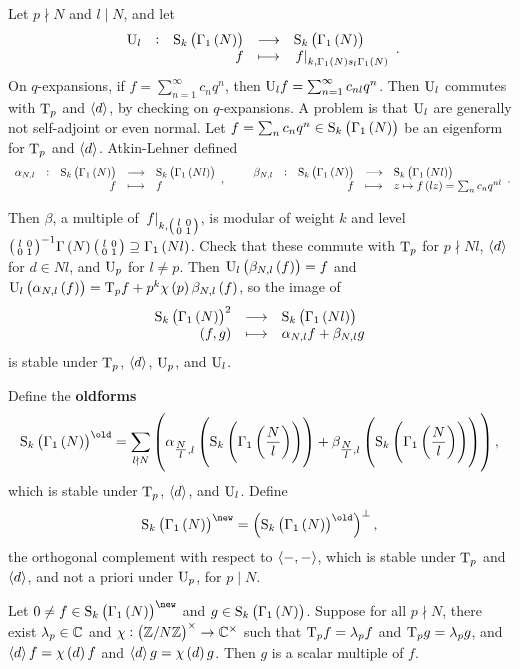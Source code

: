 
Let $ p \nmid N $ and $ l \mid N $, and let
$$ \function[\U_l]{\S_k\br{\Gamma_1\br{N}}}{\S_k\br{\Gamma_1\br{N}}}{f}{\eval{f}_{k, \Gamma_1\br{N}s_l\Gamma_1\br{N}}}. $$
On $ q $-expansions, if $ f = \sum_{n = 1}^\infty c_nq^n $, then $ \mathrm{U}_lf = \sum_{n = 1}^\infty c_{nl}q^n $. Then $ \mathrm{U}_l $ commutes with $ \mathrm{T}_p $ and $ \left\langle d \right\rangle $, by checking on $ q $-expansions. A problem is that $ \mathrm{U}_l $ are generally not self-adjoint or even normal. Let $ f = \sum_n c_nq^n \in \S_k\br{\Gamma_1\br{N}} $ be an eigenform for $ \mathrm{T}_p $ and $ \left\langle d \right\rangle $. Atkin-Lehner defined
$$ \function[\alpha_{N, l}]{\S_k\br{\Gamma_1\br{N}}}{\S_k\br{\Gamma_1\br{Nl}}}{f}{f}, \qquad \function[\beta_{N, l}]{\S_k\br{\Gamma_1\br{N}}}{\S_k\br{\Gamma_1\br{Nl}}}{f}{z \mapsto f\br{lz} = \sum_n c_nq^{nl}}. $$

\pagebreak

Then $ \beta $, a multiple of $ \left. f \right|_{k, \begin{psmallmatrix} l & 0 \\ 0 & 1 \end{psmallmatrix}} $, is modular of weight $ k $ and level $ \twobytwosmall{l}{0}{0}{1}^{-1}\Gamma\br{N}\twobytwosmall{l}{0}{0}{1} \supseteq \Gamma_1\br{Nl} $. Check that these commute with $ \mathrm{T}_p $ for $ p \nmid Nl $, $ \left\langle d \right\rangle $ for $ d \in \unit{Nl} $, and $ \mathrm{U}_p $ for $ l \ne p $. Then $ \U_l\br{\beta_{N, l}\br{f}} = f $ and $ \U_l\br{\alpha_{N, l}\br{f}} = \T_pf + p^k\chi\br{p}\beta_{N, l}\br{f} $, so the image of
$$ \function{\S_k\br{\Gamma_1\br{N}}^2}{\S_k\br{\Gamma_1\br{Nl}}}{\br{f, g}}{\alpha_{N, l}f + \beta_{N, l}g} $$
is stable under $ \mathrm{T}_p $, $ \left\langle d \right\rangle $, $ \mathrm{U}_p $, and $ \mathrm{U}_l $.

\begin{definition}
Define the \textbf{oldforms}
$$ \S_k\br{\Gamma_1\br{N}}^{\old} = \sum_{l \nmid N} \br{\alpha_{\tfrac{N}{l}, l}\br{\S_k\br{\Gamma_1\br{\dfrac{N}{l}}}} + \beta_{\tfrac{N}{l}, l}\br{\S_k\br{\Gamma_1\br{\dfrac{N}{l}}}}}, $$
which is stable under $ \mathrm{T}_p $, $ \left\langle d \right\rangle $, and $ \mathrm{U}_l $. Define
$$ \S_k\br{\Gamma_1\br{N}}^{\new} = \br{\S_k\br{\Gamma_1\br{N}}^{\old}}^\perp, $$
the orthogonal complement with respect to $ \left\langle -, - \right\rangle $, which is stable under $ \mathrm{T}_p $ and $ \left\langle d \right\rangle $, and not a priori under $ \mathrm{U}_p $, for $ p \mid N $.
\end{definition}

\begin{theorem}
Let $ 0 \ne f \in \S_k\br{\Gamma_1\br{N}}^{\new} $ and $ g \in \S_k\br{\Gamma_1\br{N}} $. Suppose for all $ p \nmid N $, there exist $ \lambda_p \in \mathbb{C} $ and $ \chi : \unit{N} \to \CC^\times $ such that $ \mathrm{T}_pf = \lambda_pf $ and $ \mathrm{T}_pg = \lambda_pg $, and $ \abr{d}f = \chi\br{d}f $ and $ \abr{d}g = \chi\br{d}g $. Then $ g $ is a scalar multiple of $ f $.
\end{theorem}

